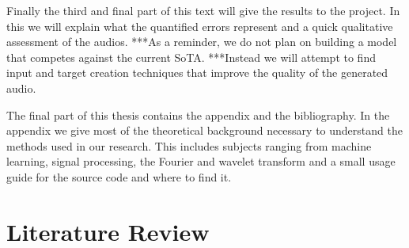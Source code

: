 \documentclass{book}
\begin{document}
\par
Finally the third and final part of this text will give the results to the project.
In this we will explain what the quantified errors represent and a quick qualitative assessment of the audios.
***As a reminder, we do not plan on building a model that competes against the current SoTA.
***Instead we will attempt to find input and target creation techniques that improve the quality of the generated audio.
\par
The final part of this thesis contains the appendix and the bibliography.
In the appendix we give most of the theoretical background necessary to understand the methods used in our research.
This includes subjects ranging from machine learning, signal processing, the Fourier and wavelet transform and a small usage guide for the source code and where to find it.

\part{Literature Review}
\end{document}
